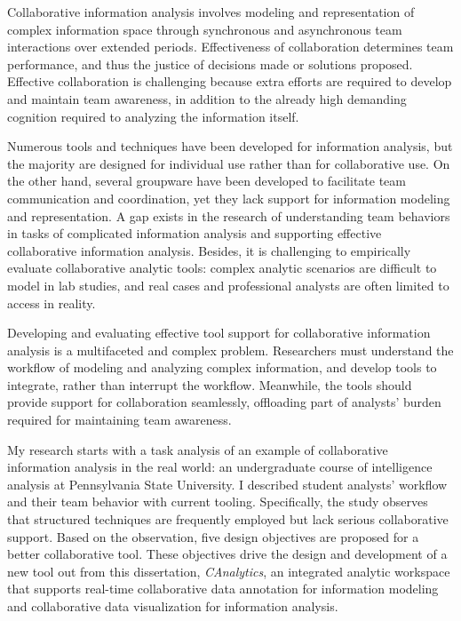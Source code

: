 
Collaborative information analysis involves modeling and representation of complex information space through synchronous and asynchronous team interactions over extended periods. Effectiveness of collaboration determines team performance, and thus the justice of decisions made or solutions proposed. Effective collaboration is challenging because extra efforts are required to develop and maintain team awareness, in addition to the already high demanding cognition required to analyzing the information itself. 

Numerous tools and techniques have been developed for information analysis, but the majority are designed for individual use rather than for collaborative use. On the other hand, several groupware have been developed to facilitate team communication and coordination, yet they lack support for information modeling and representation. A gap exists in the research of understanding team behaviors in tasks of complicated information analysis and supporting effective collaborative information analysis. Besides, it is challenging to empirically evaluate collaborative analytic tools: complex analytic scenarios are difficult to model in lab studies, and real cases and professional analysts are often limited to access in reality.

Developing and evaluating effective tool support for collaborative information analysis is a multifaceted and complex problem. Researchers must understand the workflow of modeling and analyzing complex information, and develop tools to integrate, rather than interrupt the workflow. Meanwhile, the tools should provide support for collaboration seamlessly, offloading part of analysts' burden required for maintaining team awareness. 

My research starts with a task analysis of an example of collaborative information analysis in the real world: an undergraduate course of intelligence analysis at Pennsylvania State University. I described student analysts' workflow and their team behavior with current tooling. Specifically, the study observes that structured techniques are frequently employed but lack serious collaborative support. Based on the observation, five design objectives are proposed for a better collaborative tool. These objectives drive the design and development of a new tool out from this dissertation, \textit{CAnalytics}, an integrated analytic workspace that supports real-time collaborative data annotation for information modeling and collaborative data visualization for information analysis. 

